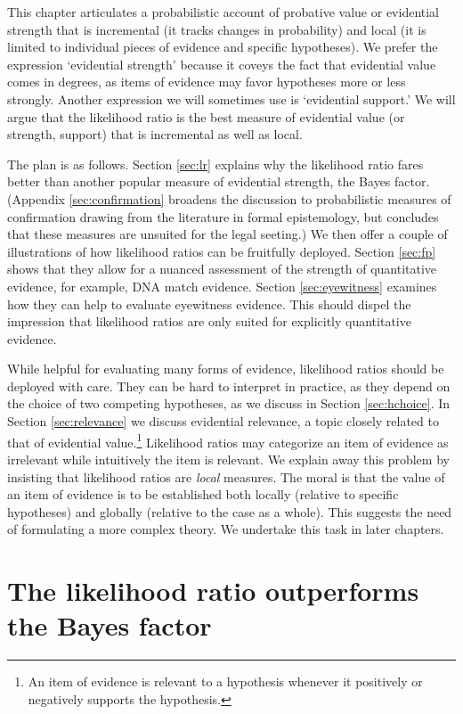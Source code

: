 \documentclass[
  10pt,
  dvipsnames,enabledeprecatedfontcommands]{scrartcl}
\begin{document}
This chapter articulates a probabilistic account of probative value or
evidential strength that is incremental (it tracks changes in
probability) and local (it is limited to individual pieces of evidence
and specific hypotheses). We prefer the expression `evidential strength'
because it coveys the fact that evidential value comes in degrees, as
items of evidence may favor hypotheses more or less strongly. Another
expression we will sometimes use is `evidential support.' We will argue
that the likelihood ratio is the best measure of evidential value (or
strength, support) that is incremental as well as local.

The plan is as follows. Section \ref{sec:lr} explains why the likelihood
ratio fares better than another popular measure of evidential strength,
the Bayes factor. (Appendix \ref{sec:confirmation} broadens the
discussion to probabilistic measures of confirmation drawing from the
literature in formal epistemology, but concludes that these measures are
unsuited for the legal seeting.) We then offer a couple of illustrations
of how likelihood ratios can be fruitfully deployed. Section
\ref{sec:fp} shows that they allow for a nuanced assessment of the
strength of quantitative evidence, for example, DNA match evidence.
Section \ref{sec:eyewitness} examines how they can help to evaluate
eyewitness evidence. This should dispel the impression that likelihood
ratios are only suited for explicitly quantitative evidence.

While helpful for evaluating many forms of evidence, likelihood ratios
should be deployed with care. They can be hard to interpret in practice,
as they depend on the choice of two competing hypotheses, as we discuss
in Section \ref{sec:hchoice}. In Section \ref{sec:relevance} we discuss
evidential relevance, a topic closely related to that of evidential
value.\footnote{An item of evidence is relevant to a hypothesis whenever
  it positively or negatively supports the hypothesis.} Likelihood
ratios may categorize an item of evidence as irrelevant while
intuitively the item is relevant. We explain away this problem by
insisting that likelihood ratios are \textit{local} measures. The moral
is that the value of an item of evidence is to be established both
locally (relative to specific hypotheses) and globally (relative to the
case as a whole). This suggests the need of formulating a more complex
theory. We undertake this task in later chapters.

\hypertarget{the-likelihood-ratio-outperforms-the-bayes-factor}{%
\section{The likelihood ratio outperforms the Bayes
factor}\label{the-likelihood-ratio-outperforms-the-bayes-factor}}
\end{document}
